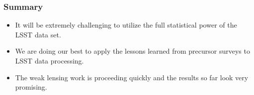 \documentclass{beamer}
\begin{document}
\frame
{


    \frametitle{Summary}

    \begin{itemize} 

        \item It will be extremely challenging to utilize the full statistical power
            of the LSST data set.

        \item We are doing our best to apply the lessons learned from precursor surveys to
            LSST data processing.

        \item The weak lensing work is proceeding quickly and the results so far look
            very promising.

    \end{itemize} 

}
\end{document}
